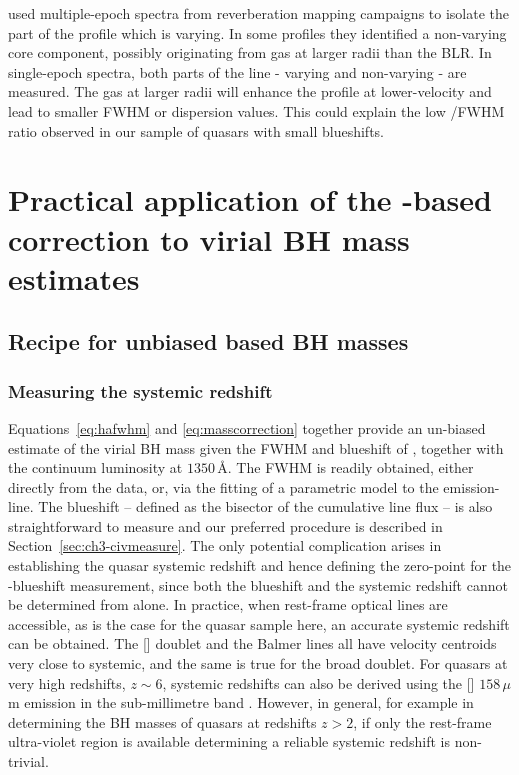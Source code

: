 \citet{denney12} used multiple-epoch spectra from reverberation mapping campaigns to isolate the part of the  profile which is varying.
In some profiles they identified a non-varying core component, possibly originating from gas at larger radii than the BLR. 
In single-epoch spectra, both parts of the line - varying and non-varying - are measured. 
The gas at larger radii will enhance the profile at lower-velocity and lead to smaller FWHM or dispersion values.
This could explain the low /\ha FWHM ratio observed in our sample of quasars with small  blueshifts. 

\section[Practical application]{Practical application of the -based correction to virial BH mass estimates}
\label{sec:ch3-application}

\subsection{Recipe for unbiased  based BH masses}
\label{sec:ch3-recipe}

\subsubsection{Measuring the systemic redshift}

Equations~\ref{eq:hafwhm} and \ref{eq:masscorrection} together provide an un-biased estimate of the virial BH mass given the FWHM and blueshift of , together with the continuum luminosity at $1350$\,\AA. 
The FWHM is readily obtained, either directly from the data, or, via the fitting of a parametric model to the  emission-line. 
The blueshift -- defined as the bisector of the cumulative line flux -- is also straightforward to measure and our preferred procedure is described in Section~\ref{sec:ch3-civmeasure}.
The only potential complication arises in establishing the quasar systemic redshift and hence defining the zero-point for the -blueshift measurement, since both the blueshift and the systemic redshift cannot be determined from  alone. 
In practice, when rest-frame optical lines are accessible, as is the case for the quasar sample here, an accurate systemic redshift can be obtained. 
The [] doublet and the Balmer lines all have velocity centroids very close to systemic, and the same is true for the broad  doublet. 
For quasars at very high redshifts, $z\sim6$, systemic redshifts can also be derived using the [] $158$\,$\mu$m emission in the sub-millimetre band \citep[e.g.][]{venemans16}. 
However, in general, for example in determining the BH masses of quasars at redshifts $z>2$, if only the rest-frame ultra-violet region is available determining a reliable systemic redshift is non-trivial. 

